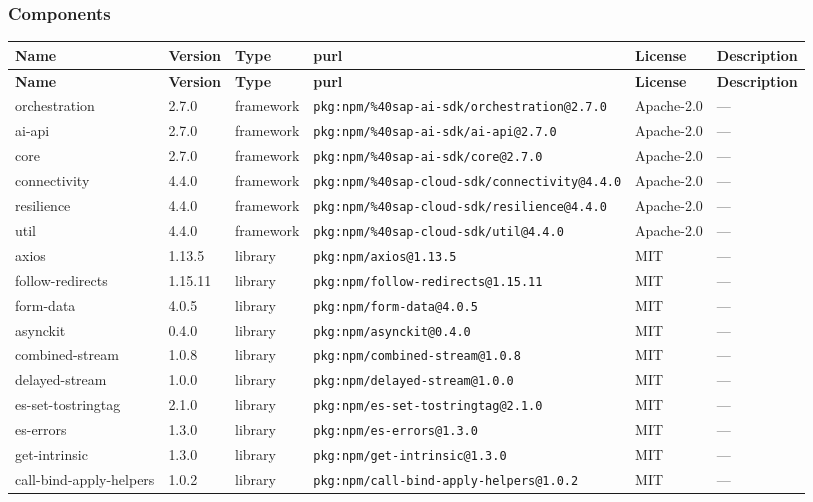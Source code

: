\documentclass[11pt]{article}
\begin{document}
\subsubsection*{Components}
\begin{longtable}{|l|l|l|p{2.2cm}|l|p{4cm}|}
\hline
\textbf{Name} & \textbf{Version} & \textbf{Type} & \textbf{purl} & \textbf{License} & \textbf{Description} \\
\hline
\endfirsthead
\hline
\textbf{Name} & \textbf{Version} & \textbf{Type} & \textbf{purl} & \textbf{License} & \textbf{Description} \\
\hline
\endhead
orchestration & 2.7.0 & framework & \texttt{pkg:npm/\%40sap-ai-sdk/orchestration@2.7.0} & Apache-2.0 & — \\
ai-api & 2.7.0 & framework & \texttt{pkg:npm/\%40sap-ai-sdk/ai-api@2.7.0} & Apache-2.0 & — \\
core & 2.7.0 & framework & \texttt{pkg:npm/\%40sap-ai-sdk/core@2.7.0} & Apache-2.0 & — \\
connectivity & 4.4.0 & framework & \texttt{pkg:npm/\%40sap-cloud-sdk/connectivity@4.4.0} & Apache-2.0 & — \\
resilience & 4.4.0 & framework & \texttt{pkg:npm/\%40sap-cloud-sdk/resilience@4.4.0} & Apache-2.0 & — \\
util & 4.4.0 & framework & \texttt{pkg:npm/\%40sap-cloud-sdk/util@4.4.0} & Apache-2.0 & — \\
axios & 1.13.5 & library & \texttt{pkg:npm/axios@1.13.5} & MIT & — \\
follow-redirects & 1.15.11 & library & \texttt{pkg:npm/follow-redirects@1.15.11} & MIT & — \\
form-data & 4.0.5 & library & \texttt{pkg:npm/form-data@4.0.5} & MIT & — \\
asynckit & 0.4.0 & library & \texttt{pkg:npm/asynckit@0.4.0} & MIT & — \\
combined-stream & 1.0.8 & library & \texttt{pkg:npm/combined-stream@1.0.8} & MIT & — \\
delayed-stream & 1.0.0 & library & \texttt{pkg:npm/delayed-stream@1.0.0} & MIT & — \\
es-set-tostringtag & 2.1.0 & library & \texttt{pkg:npm/es-set-tostringtag@2.1.0} & MIT & — \\
es-errors & 1.3.0 & library & \texttt{pkg:npm/es-errors@1.3.0} & MIT & — \\
get-intrinsic & 1.3.0 & library & \texttt{pkg:npm/get-intrinsic@1.3.0} & MIT & — \\
call-bind-apply-helpers & 1.0.2 & library & \texttt{pkg:npm/call-bind-apply-helpers@1.0.2} & MIT & — \\

\end{longtable}
\end{document}
